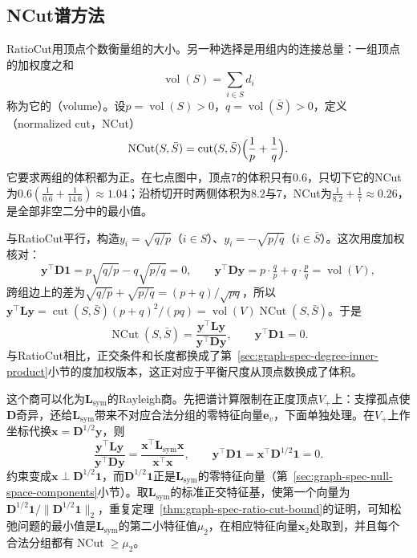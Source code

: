 \subsection{NCut谱方法}
\label{sec:graph-spec-normalized-cut}

RatioCut用顶点个数衡量组的大小。另一种选择是用组内的连接总量：一组顶点的加权度之和
\[
 \operatorname{vol}(S)=\sum_{i\in S}d_i
\]
称为它的（volume）。设$p=\operatorname{vol}(S)>0$，$q=\operatorname{vol}(\bar S)>0$，定义（normalized cut，NCut）
\begin{equation}
 \operatorname{NCut}(S,\bar S)=\operatorname{cut}(S,\bar S)\Bigl(\frac1p+\frac1q\Bigr).
 \label{eq:graph-spec-normalized-cut}
\end{equation}
它要求两组的体积都为正。在七点图中，顶点$7$的体积只有$0.6$，只切下它的NCut为$0.6(\tfrac1{0.6}+\tfrac1{14.6})\approx1.04$；沿桥切开时两侧体积为$8.2$与$7$，NCut为$\tfrac1{8.2}+\tfrac17\approx0.26$，是全部非空二分中的最小值。

与RatioCut平行，构造$y_i=\sqrt{q/p}$（$i\in S$）、$y_i=-\sqrt{p/q}$（$i\in\bar S$）。这次用度加权核对：
\[
 \bm y^{\top}\bm D\bm1=p\sqrt{q/p}-q\sqrt{p/q}=0,\qquad
 \bm y^{\top}\bm D\bm y=p\cdot\tfrac qp+q\cdot\tfrac pq=\operatorname{vol}(V),
\]
跨组边上的差为$\sqrt{q/p}+\sqrt{p/q}=(p+q)/\sqrt{pq}$，所以$\bm y^{\top}\bm L\bm y=\operatorname{cut}(S,\bar S)(p+q)^2/(pq)=\operatorname{vol}(V)\operatorname{NCut}(S,\bar S)$。于是
\[
 \operatorname{NCut}(S,\bar S)=\frac{\bm y^{\top}\bm L\bm y}{\bm y^{\top}\bm D\bm y},\qquad \bm y^{\top}\bm D\bm1=0 .
\]
与RatioCut相比，正交条件和长度都换成了第~\ref{sec:graph-spec-degree-inner-product}小节的度加权版本，这正对应于平衡尺度从顶点数换成了体积。

这个商可以化为$\bm L_{\mathrm{sym}}$的Rayleigh商。先把谱计算限制在正度顶点$V_+$上：支撑孤点使$\bm D$奇异，还给$\bm L_{\mathrm{sym}}$带来不对应合法分组的零特征向量$\bm e_v$，下面单独处理。在$V_+$上作坐标代换$\bm x=\bm D^{1/2}\bm y$，则
\[
 \frac{\bm y^{\top}\bm L\bm y}{\bm y^{\top}\bm D\bm y}=\frac{\bm x^{\top}\bm L_{\mathrm{sym}}\bm x}{\bm x^{\top}\bm x},\qquad
 \bm y^{\top}\bm D\bm1=\bm x^{\top}\bm D^{1/2}\bm1=0 .
\]
约束变成$\bm x\perp\bm D^{1/2}\bm1$，而$\bm D^{1/2}\bm1$正是$\bm L_{\mathrm{sym}}$的零特征向量（第~\ref{sec:graph-spec-null-space-components}小节）。取$\bm L_{\mathrm{sym}}$的标准正交特征基，使第一个向量为$\bm D^{1/2}\bm1/\lVert\bm D^{1/2}\bm1\rVert_2$，重复定理~\ref{thm:graph-spec-ratio-cut-bound}的证明，可知松弛问题的最小值是$\bm L_{\mathrm{sym}}$的第二小特征值$\mu_2$，在相应特征向量$\bm x_2$处取到，并且每个合法分组都有$\operatorname{NCut}\geq\mu_2$。

